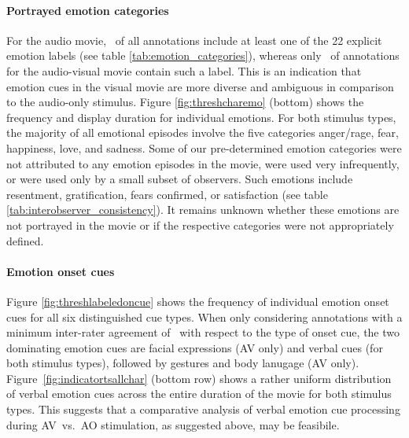 \documentclass[10pt,a4paper,twocolumn]{article}
\begin{document}
\paragraph{Portrayed emotion categories} For the audio movie,
\AOFracWithLabeledEmotions\ of all annotations include at least one of the 22
explicit emotion labels (see table \ref{tab:emotion_categories}), whereas only
\AVFracWithLabeledEmotions\ of annotations for the audio-visual movie contain
such a label. This is an indication that emotion cues in the visual movie are
more diverse and ambiguous in comparison to the audio-only stimulus. Figure
\ref{fig:threshcharemo} (bottom) shows the frequency and display duration for
individual emotions. For both stimulus types, the majority of all emotional
episodes involve the five categories anger/rage, fear, happiness, love, and
sadness. Some of our pre-determined emotion categories were not attributed
to any emotion episodes in the movie, were used very infrequently, or were used
only by a small subset of observers. Such emotions include resentment,
gratification, fears confirmed, or satisfaction (see table
\ref{tab:interobserver_consistency}). It remains unknown whether these
emotions are not portrayed in the movie or if the respective categories were not
appropriately defined.

\paragraph{Emotion onset cues} Figure \ref{fig:threshlabeledoncue} shows the
frequency of individual emotion onset cues for all six distinguished cue types.
When only considering annotations with a minimum inter-rater agreement of
\AVAggThresh\ with respect to the type of onset cue, the two dominating emotion
cues are facial expressions (AV only) and verbal cues (for both stimulus
types), followed by gestures and body lanugage (AV only).
Figure~\ref{fig:indicatortsallchar} (bottom row) shows a rather uniform
distribution of verbal emotion cues across the entire duration of the movie for
both stimulus types. This suggests that a comparative analysis of verbal
emotion cue processing during AV~vs.~AO stimulation, as suggested above, may be
feasibile.
\end{document}
